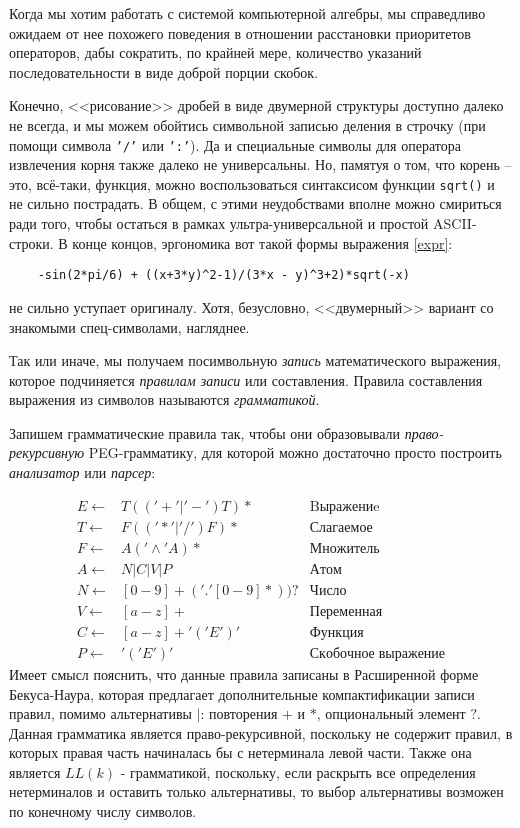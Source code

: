 \documentclass[10pt]{report}
\begin{document}
Когда мы хотим работать с системой компьютерной алгебры, мы справедливо ожидаем от нее похожего поведения в отношении расстановки приоритетов операторов, 
	дабы сократить, по крайней мере,
	количество указаний последовательности в виде доброй порции скобок.

Конечно, <<рисование>> дробей в виде двумерной структуры доступно далеко не всегда, и мы можем обойтись символьной записью деления в строчку (при помощи символа \texttt{'/'} или \texttt{':'}).
Да и специальные символы для оператора извлечения корня также далеко не универсальны. 
	Но, памятуя о том, что корень -- это, всё-таки, функция, можно воспользоваться синтаксисом функции \texttt{sqrt()} и не сильно пострадать.
В общем, с этими неудобствами вполне можно смириться ради того, чтобы остаться в рамках ультра-универсальной и простой ASCII-строки.
В конце концов, эргономика вот такой формы выражения \eqref{expr}:
\begin{verbatim}
	-sin(2*pi/6) + ((x+3*y)^2-1)/(3*x - y)^3+2)*sqrt(-x)
\end{verbatim}
не сильно уступает оригиналу. Хотя, безусловно, <<двумерный>> вариант со знакомыми спец-символами, нагляднее.

Так или иначе, мы получаем посимвольную {\em запись} математического выражения, которое подчиняется {\em правилам записи} или составления.
Правила составления выражения из символов называются {\em грамматикой}.

Запишем грамматические правила так, чтобы они образовывали {\em право-рекурсивную} PEG-грамматику\cite{ford2004}, для которой можно достаточно просто построить {\em анализатор} или {\em парсер}:

\begin{equation}\label{gram1}
	\begin{array}{rll}
		E \gets &  T (('+'|'-') T) * & \mathrm{Bыражениe} \\
		T \gets &  F (('*'|'/') F) * & \mathrm{Слагаемое} \\
		F \gets &  A ('\wedge' A) * & \mathrm{Множитель} \\
		A \gets &  N | C | V | P & \mathrm{Атом} \\
		N \gets & [0-9]+ ('.' [0-9]*))? & \mathrm{Число} \\
		V \gets & [a-z]+ & \mathrm{Переменная} \\
		C \gets & [a-z]+ '(' E ')' & \mathrm{Функция} \\
		P \gets & '(' E ')' & \mathrm{Скобочное\; выражение} 
	\end{array}
\end{equation}
Имеет смысл пояснить, что данные правила записаны в Расширенной форме Бекуса-Наура, которая предлагает дополнительные компактификации записи правил, помимо альтернативы $|$: повторения $+$ и $*$, опциональный элемент $?$.
Данная грамматика является право-рекурсивной, поскольку не содержит правил, в которых правая часть начиналась бы с нетерминала левой части.
Также она является $LL(k)$ - грамматикой\cite{llk}, поскольку, если раскрыть все определения нетерминалов и оставить только альтернативы, то выбор альтернативы возможен по конечному числу символов.
\end{document}
